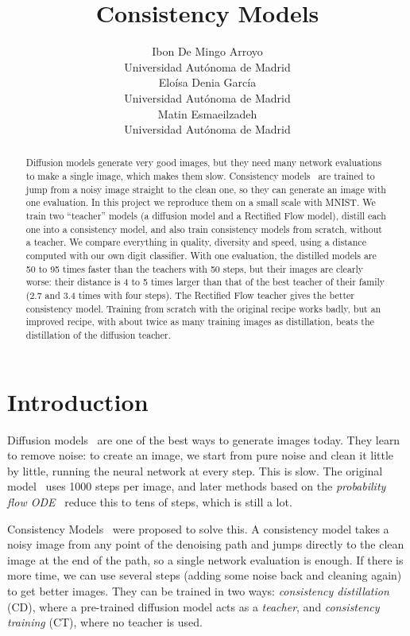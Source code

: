 \documentclass{article}
\title{Consistency Models}
\author{
Ibon De Mingo Arroyo \\
Universidad Autónoma de Madrid \\
\And
Eloísa Denia García \\
Universidad Autónoma de Madrid \\
\And
Matin Esmaeilzadeh \\
Universidad Autónoma de Madrid \\
}
\begin{document}
\maketitle

\begin{abstract}
Diffusion models generate very good images, but they need many network
evaluations to make a single image, which makes them slow. Consistency
models~\cite{song2023consistency} are trained to jump from a noisy image
straight to the clean one, so they can generate an image with one evaluation.
In this project we reproduce them on a small scale with MNIST. We train two
``teacher'' models (a diffusion model and a Rectified Flow model), distill each
one into a consistency model, and also train consistency models from scratch,
without a teacher. We compare everything in quality, diversity and speed, using
a distance computed with our own digit classifier. With one evaluation, the
distilled models are 50 to 95 times faster than the teachers with 50 steps, but
their images are clearly worse: their distance is 4 to 5 times larger than that
of the best teacher of their family (2.7 and 3.4 times with four steps). The
Rectified Flow teacher gives the better consistency model. Training from scratch
with the original recipe works badly, but an improved recipe, with about twice
as many training images as distillation, beats the distillation of the
diffusion teacher.
\end{abstract}

\section{Introduction}
\label{sec:introduction}

Diffusion models~\cite{ho2020ddpm,song2021sde} are one of the best ways to
generate images today. They learn to remove noise: to create an image, we start
from pure noise and clean it little by little, running the neural network at
every step. This is slow. The original model~\cite{ho2020ddpm} uses 1000 steps
per image, and later methods based on the \emph{probability flow
ODE}~\cite{song2021sde} reduce this to tens of steps, which is still a lot.

Consistency Models~\cite{song2023consistency} were proposed to solve this. A
consistency model takes a noisy image from any point of the denoising path and
jumps directly to the clean image at the end of the path, so a single network
evaluation is enough. If there is more time, we can use several steps (adding
some noise back and cleaning again) to get better images. They can be trained in
two ways: \emph{consistency distillation} (CD), where a pre-trained diffusion
model acts as a \emph{teacher}, and \emph{consistency training} (CT), where no
teacher is used.
\end{document}
